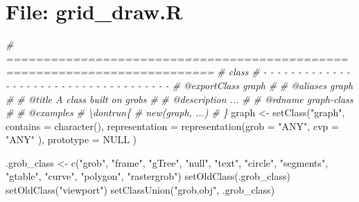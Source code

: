 \documentclass[
]{article}
\newenvironment{Shaded}{\begin{snugshade}}{\end{snugshade}}
\newcommand{\AttributeTok}[1]{\textcolor[rgb]{0.77,0.63,0.00}{#1}}
\newcommand{\CommentTok}[1]{\textcolor[rgb]{0.56,0.35,0.01}{\textit{#1}}}
\newcommand{\ConstantTok}[1]{\textcolor[rgb]{0.00,0.00,0.00}{#1}}
\newcommand{\FunctionTok}[1]{\textcolor[rgb]{0.00,0.00,0.00}{#1}}
\newcommand{\NormalTok}[1]{#1}
\newcommand{\OtherTok}[1]{\textcolor[rgb]{0.56,0.35,0.01}{#1}}
\newcommand{\StringTok}[1]{\textcolor[rgb]{0.31,0.60,0.02}{#1}}
\begin{document}
\hypertarget{file-grid_draw.r}{%
\section{File: grid\_draw.R}\label{file-grid_draw.r}}

\begin{Shaded}
\begin{Highlighting}[]
\CommentTok{\# ==========================================================================}
\CommentTok{\# class}
\CommentTok{\# {-} {-} {-} {-} {-} {-} {-} {-} {-} {-} {-} {-} {-} {-} {-} {-} {-} {-} {-} {-} {-} {-} {-} {-} {-} {-} {-} {-} {-} {-} {-} {-} {-} {-} {-} {-} {-}}
\CommentTok{\#\textquotesingle{} @exportClass graph}
\CommentTok{\#\textquotesingle{}}
\CommentTok{\#\textquotesingle{} @aliases graph}
\CommentTok{\#\textquotesingle{}}
\CommentTok{\#\textquotesingle{} @title A class built on \textquotesingle{}grobs\textquotesingle{}}
\CommentTok{\#\textquotesingle{}}
\CommentTok{\#\textquotesingle{} @description ...}
\CommentTok{\#\textquotesingle{}}
\CommentTok{\#\textquotesingle{} @rdname graph{-}class}
\CommentTok{\#\textquotesingle{}}
\CommentTok{\#\textquotesingle{} @examples}
\CommentTok{\#\textquotesingle{} \textbackslash{}dontrun\{}
\CommentTok{\#\textquotesingle{} new(\textquotesingle{}graph\textquotesingle{}, ...)}
\CommentTok{\#\textquotesingle{} \}}
\NormalTok{graph }\OtherTok{\textless{}{-}} 
  \FunctionTok{setClass}\NormalTok{(}\StringTok{"graph"}\NormalTok{, }
    \AttributeTok{contains =} \FunctionTok{character}\NormalTok{(),}
    \AttributeTok{representation =} 
      \FunctionTok{representation}\NormalTok{(}\AttributeTok{grob =} \StringTok{"ANY"}\NormalTok{,}
        \AttributeTok{cvp =} \StringTok{"ANY"}
\NormalTok{        ),}
      \AttributeTok{prototype =} \ConstantTok{NULL}
\NormalTok{  )}

\NormalTok{.grob\_class }\OtherTok{\textless{}{-}} \FunctionTok{c}\NormalTok{(}\StringTok{"grob"}\NormalTok{, }\StringTok{"frame"}\NormalTok{, }\StringTok{"gTree"}\NormalTok{, }\StringTok{"null"}\NormalTok{,}
  \StringTok{"text"}\NormalTok{, }\StringTok{"circle"}\NormalTok{, }\StringTok{"segments"}\NormalTok{, }\StringTok{"gtable"}\NormalTok{,}
  \StringTok{"curve"}\NormalTok{, }\StringTok{"polygon"}\NormalTok{, }\StringTok{"rastergrob"}\NormalTok{)}
\FunctionTok{setOldClass}\NormalTok{(.grob\_class)}
\FunctionTok{setOldClass}\NormalTok{(}\StringTok{"viewport"}\NormalTok{)}
\FunctionTok{setClassUnion}\NormalTok{(}\StringTok{"grob.obj"}\NormalTok{, .grob\_class)}


\end{Highlighting}
\end{Shaded}
\end{document}

